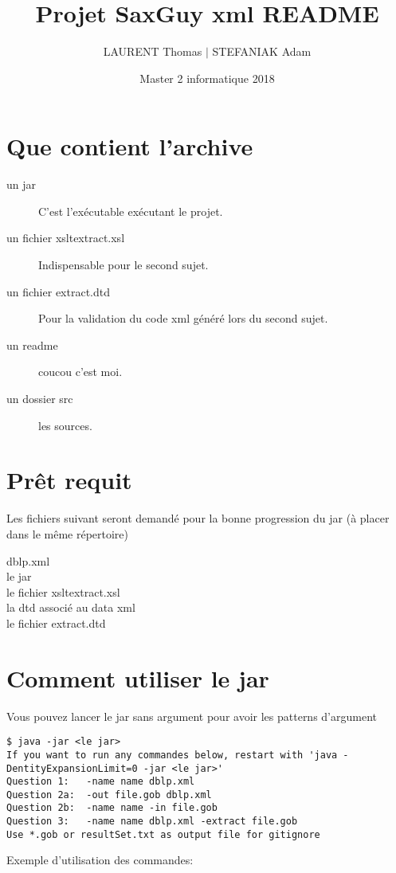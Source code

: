 \documentclass[french, 12pt]{report}
\title{Projet SaxGuy xml README}
\author{LAURENT Thomas $|$ STEFANIAK Adam}
\date{Master 2 informatique 2018}
\begin{document}
\maketitle
\pagebreak

\begin{titlepage}
\end{titlepage}
\pagebreak

\section{Que contient l'archive}
\begin{description}
\item[un jar] C'est l'exécutable exécutant le projet.
\item[un fichier xsltextract.xsl] Indispensable pour le second sujet.
\item[un fichier extract.dtd] Pour la validation du code xml généré lors du second sujet.
\item[un readme] coucou c'est moi.
\item[un dossier src] les sources. 
\end{description}

\section{Prêt requit}
Les fichiers suivant seront demandé pour la bonne progression du jar (à placer dans le même répertoire)
\begin{description}
\item[dblp.xml]
\item[le jar]
\item[le fichier xsltextract.xsl]
\item[la dtd associé au data xml]
\item[le fichier extract.dtd]
\end{description}

\section{Comment utiliser le jar}
Vous pouvez lancer le jar sans argument pour avoir les patterns d'argument

\lstset{style=mlpythoncode}
\begin{lstlisting}[]
$ java -jar <le jar>
If you want to run any commandes below, restart with 'java -DentityExpansionLimit=0 -jar <le jar>'
Question 1:   -name name dblp.xml
Question 2a:  -out file.gob dblp.xml
Question 2b:  -name name -in file.gob
Question 3:   -name name dblp.xml -extract file.gob
Use *.gob or resultSet.txt as output file for gitignore
\end{lstlisting}
\pagebreak
Exemple d'utilisation des commandes:
\end{document}
